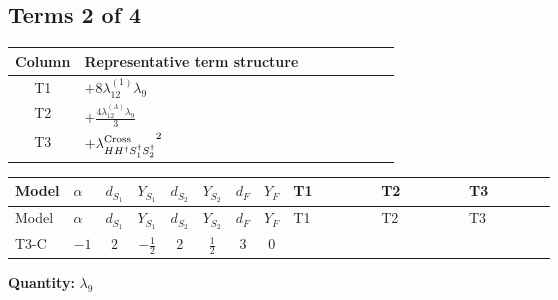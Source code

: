 \documentclass[8pt]{article}
\begin{document}
\begin{landscape}
\subsection*{Terms 2 of 4}
\begin{center}
\begin{tabular}{@{}c >{\raggedright\arraybackslash}p{0.82\linewidth}@{}}
\toprule
Column & Representative term structure \\
\midrule
T1 & \(\displaystyle +8 {\lambda_{12}^{(1)}} {\lambda_{9}}\) \\
\midrule
T2 & \(\displaystyle +\frac{4 {\lambda_{12}^{(A)}} {\lambda_{9}}}{3}\) \\
\midrule
T3 & \(\displaystyle +{\lambda_{H H^\dagger S_1^\dagger S_2^\dagger}^{\rm Cross}}^2\) \\
\midrule
\bottomrule
\end{tabular}
\end{center}
\smallskip
\tiny
\begin{longtable}{@{}llcccccc >{\raggedright\arraybackslash}p{0.21\linewidth} >{\raggedright\arraybackslash}p{0.21\linewidth} >{\raggedright\arraybackslash}p{0.21\linewidth}@{}}
\toprule
Model & $\alpha$ & $d_{S_1}$ & $Y_{S_1}$ & $d_{S_2}$ & $Y_{S_2}$ & $d_F$ & $Y_F$ & T1 & T2 & T3 \\
\midrule
\endfirsthead
\toprule
Model & $\alpha$ & $d_{S_1}$ & $Y_{S_1}$ & $d_{S_2}$ & $Y_{S_2}$ & $d_F$ & $Y_F$ & T1 & T2 & T3 \\
\midrule
\endhead
T3-C & $-1$ & $2$ & $-\frac{1}{2}$ & $2$ & $\frac{1}{2}$ & $3$ & $0$ & \scriptsize\adjustbox{max width=\linewidth}{$\begin{gathered} +8 {\lambda_{12}^{(1)}} {\lambda_{9}}\end{gathered}$} & \scriptsize\adjustbox{max width=\linewidth}{$\begin{gathered} +\frac{4 {\lambda_{12}^{(A)}} {\lambda_{9}}}{3}\end{gathered}$} & \scriptsize\adjustbox{max width=\linewidth}{$\begin{gathered} +{\lambda_{H H^\dagger S_1^\dagger S_2^\dagger}^{\rm Cross}}^2\end{gathered}$} \\
\midrule
\bottomrule
\end{longtable}
\clearpage
\noindent\textbf{Quantity: }$\lambda_{9}$\par\smallskip

\end{landscape}
\end{document}
